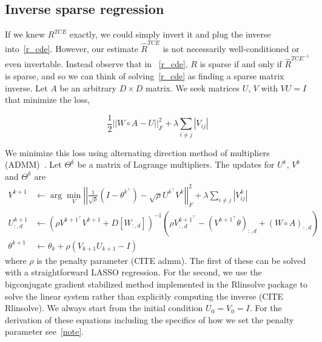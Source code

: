 \documentclass{article}
\begin{document}
\subsection{Inverse sparse regression}
If we knew $R^{TCE}$ exactly, we could simply invert it and plug the inverse
into~\ref{r_cde}. However, our estimate $\hat{R}^{TCE}$ is not necessarily
well-conditioned or even invertable. Instead observe that in ~\ref{r_cde}, $R$ is
sparse if and only if $\hat{R}^{TCE^{-1}}$ is sparse, and so we can think of
solving~\ref{r_cde} as finding a sparse matrix inverse. Let $A$ be an arbitrary $D\times D$
matrix. We seek matrices $U$, $V$ with $VU=I$ that minimize the loss,

\begin{equation}
\frac{1}{2} ||W \circ A - U||_F^2 + \lambda \sum_{i\neq j}|V_{ij}|
\end{equation}

We minimize this loss using alternating direction method of multipliers (ADMM)~\cite{Boyd2010}.
Let $\Theta^k$ be a matrix of Lagrange multipliers. The updates for $U^k$, $V^k$ and $\Theta^k$
are
\begin{align}
V^{k+1} &\leftarrow \arg \min_{V} \left|\left|\frac{1}{\sqrt{\rho}}\left(I-\theta^{k^\top}\right) -
      \sqrt{\rho} U^{k^\top} V^k\right|\right|_F^2 + \lambda \sum_{i\neq j} \left|V^k_{ij} \right| \\
U_{:, d}^{k+1} &\leftarrow \left(\rho V^{k+1 ^ \top} V^{k+1} + D[W_{:, d}]\right)^{-1} \left(\rho V^{k+1 ^ \top}_{:, d} -
  \left(V^{k+1 ^ \top} \theta\right)_{:, d} + (W \circ A)_{:, d}\right) \\
\theta^{k+1} &\leftarrow \theta_{k} + \rho(V_{k+1}U_{k+1}-I)
\end{align}
where $\rho$ is the penalty parameter (CITE admm).
The first of these can be solved with a straightforward LASSO regression. For the second,
we use the bigconjugate gradient stabilized method implemented
in the Rlinsolve package to solve the linear system
rather than explicitly computing the inverse (CITE Rlinsolve).
We always start from the initial condition $U_0 = V_0 = I$.
 For the derivation of these equations including
the specifics of how we set
the penalty parameter see~\ref{note}.
\end{document}

